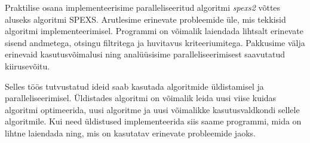 Praktilise osana implementeerisime paralleliseeritud algoritmi \emph{spexs2} võttes aluseks algoritmi SPEXS\cite{spexs}. Arutlesime erinevate probleemide üle, mis tekkisid algoritmi implementeerimisel. Programmi on võimalik laiendada lihtsalt erinevate sisend andmetega, otsingu filtritega ja huvitavus kriteeriumitega. Pakkusime välja erinevaid kasutusvõimalusi ning analüüsisime paralleliseerimisest saavutatud kiirusevõitu.

Selles töös tutvustatud ideid saab kasutada algoritmide üldistamisel ja paralleliseerimisel. Üldistades algoritmi on võimalik leida uusi viise kuidas algoritmi optimeerida, uusi algoritme ja uusi võimalikke kasutusvaldkondi sellele algoritmile. Kui need üldistused implementeerida siis saame programmi, mida on lihtne laiendada ning, mis on kasutatav erinevate probleemide jaoks.

